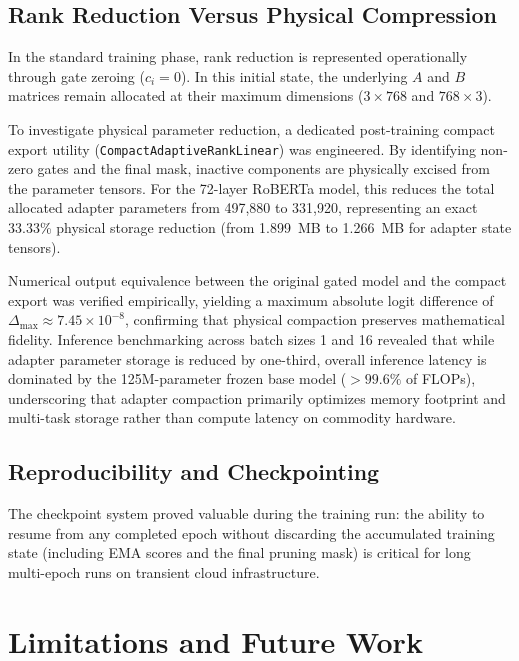 \documentclass[conference]{IEEEtran}
\begin{document}
\subsection{Rank Reduction Versus Physical Compression}
In the standard training phase, rank reduction is represented
operationally through gate zeroing ($c_i = 0$). In this initial
state, the underlying $A$ and $B$ matrices remain allocated at
their maximum dimensions ($3 \times 768$ and $768 \times 3$).

To investigate physical parameter reduction, a dedicated
post-training compact export utility (\texttt{CompactAdaptiveRankLinear})
was engineered. By identifying non-zero gates and the final
mask, inactive components are physically excised from the parameter
tensors. For the 72-layer RoBERTa model, this reduces the total
allocated adapter parameters from 497,880 to 331,920, representing
an exact 33.33\% physical storage reduction (from 1.899~MB to
1.266~MB for adapter state tensors).

Numerical output equivalence between the original gated model and
the compact export was verified empirically, yielding a maximum
absolute logit difference of $\Delta_{\max} \approx 7.45 \times 10^{-8}$,
confirming that physical compaction preserves mathematical fidelity.
Inference benchmarking across batch sizes 1 and 16 revealed that
while adapter parameter storage is reduced by one-third, overall
inference latency is dominated by the 125M-parameter frozen base
model ($>99.6\%$ of FLOPs), underscoring that adapter compaction
primarily optimizes memory footprint and multi-task storage rather
than compute latency on commodity hardware.

\subsection{Reproducibility and Checkpointing}
The checkpoint system proved valuable during the training run:
the ability to resume from any completed epoch without
discarding the accumulated training state (including EMA
scores and the final pruning mask) is critical for long
multi-epoch runs on transient cloud infrastructure.

\section{Limitations and Future Work}
\label{sec:limitations}
\end{document}

